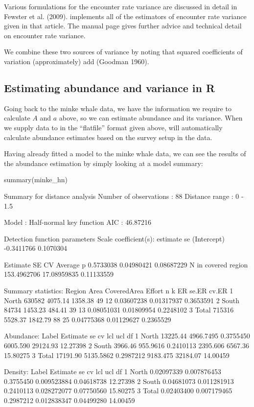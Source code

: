 \documentclass[article]{jss}
\begin{document}
Various formulations for the encounter rate variance are discussed in
detail in Fewster et al. (2009).  implements all of the
estimators of encounter rate variance given in that article. The
 manual page gives further advice and technical detail on
encounter rate variance.

We combine these two sources of variance by noting that squared
coefficients of variation (approximately) add (Goodman 1960).

\subsection{Estimating abundance and variance in
R}\label{estimating-abundance-and-variance-in-r}

Going back to the minke whale data, we have the information we require
to calculate \(A\) and \(a\) above, so we can estimate abundance and its
variance. When we supply data to  in the ``flatfile'' format
given above,  will automatically calculate abundance estimates
based on the survey setup in the data.

Having already fitted a model to the minke whale data, we can see the
results of the abundance estimation by simply looking at a model
summary:

\begin{CodeChunk}
\begin{CodeInput}
summary(minke_hn)
\end{CodeInput}
\begin{CodeOutput}

Summary for distance analysis 
Number of observations :  88 
Distance range         :  0  -  1.5 

Model : Half-normal key function 
AIC   : 46.87216 

Detection function parameters
Scale coefficient(s):  
              estimate        se
(Intercept) -0.3411766 0.1070304

                       Estimate          SE         CV
Average p             0.5733038  0.04980421 0.08687229
N in covered region 153.4962706 17.08959835 0.11133559

Summary statistics:
  Region   Area CoveredArea  Effort  n  k         ER      se.ER     cv.ER
1  North 630582     4075.14 1358.38 49 12 0.03607238 0.01317937 0.3653591
2  South  84734     1453.23  484.41 39 13 0.08051031 0.01809954 0.2248102
3  Total 715316     5528.37 1842.79 88 25 0.04775368 0.01129627 0.2365529

Abundance:
  Label Estimate        se        cv      lcl      ucl       df
1 North 13225.44 4966.7495 0.3755450 6005.590 29124.93 12.27398
2 South  3966.46  955.9616 0.2410113 2395.606  6567.36 15.80275
3 Total 17191.90 5135.5862 0.2987212 9183.475 32184.07 14.00459

Density:
  Label   Estimate          se        cv         lcl        ucl       df
1 North 0.02097339 0.007876453 0.3755450 0.009523884 0.04618738 12.27398
2 South 0.04681073 0.011281913 0.2410113 0.028272077 0.07750560 15.80275
3 Total 0.02403400 0.007179465 0.2987212 0.012838347 0.04499280 14.00459
\end{CodeOutput}
\end{CodeChunk}
\end{document}
